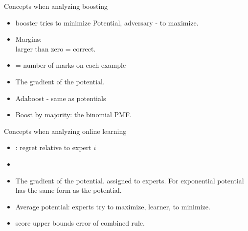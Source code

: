 \documentclass{beamer}
\begin{document}
\begin{frame}{Concepts when analyzing boosting}
  \begin{itemize}
  \item booster tries to minimize Potential, adversary - to maximize.
  \item {}  Margins:\\
      larger than zero = correct.
   \item {} = number of marks on each example
     \begin{small}
       \R{\[
           \Phi(x_1,\ldots,x_n) = \sum_j (\beta^i_{r(x_i)})
         \]
         \[
       \beta^i_r = \sum_{j=0}^{\lfloor k/2 \rfloor-r} \binom{k-i}{j}\left(\frac{1}{2}+\gamma\right)^j\left(\frac{1}{2}-\gamma\right)^{k-1-j}
     \]}
 \end{small}
\end{itemize}
\end{frame}
\begin{frame}
  \begin{itemize}
   \item {} The gradient of the potential.
   \item Adaboost - same as potentials
     \item Boost by majority: the binomial PMF.
  \end{itemize}
\end{frame}
  
\begin{frame}{Concepts when analyzing online learning}
  \begin{itemize}
   \item {} : regret relative to expert $i$
   \item {}
  \item {} The gradient of the potential. assigned to experts. For exponential potential has the same form as the potential.
  \item {} Average potential:  experts try to maximize, learner, to minimize.
  \item score upper bounds error of combined rule.
  \end{itemize}
\end{frame}

  
\end{document}
